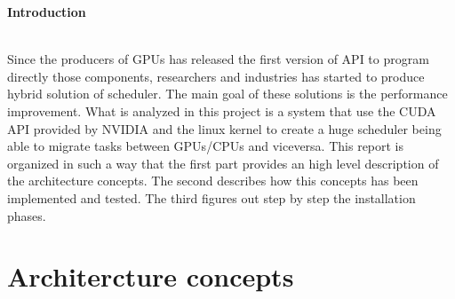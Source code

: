 \documentclass[a4paper,13pt]{article}
\newenvironment*{myabstract}{\begin{Large}\bf}{\end{Large}\\[2.5ex]}%
\begin{document}
\vspace{4ex}	%
\begin{multicols}{2}

\begin{myabstract} Introduction \end{myabstract}
Since the producers of GPUs has released the first version of API to program directly those 
components, researchers and industries has started to produce hybrid solution of scheduler. 
The main goal of these solutions is the performance improvement. What is analyzed in this project is 
a system that use the CUDA API provided by NVIDIA and the linux kernel to create a huge scheduler
being able to migrate tasks between GPUs/CPUs and viceversa. This report is organized in such a way
that the first part provides an high level description of the architecture concepts. The 
second describes how this concepts has been implemented and tested. The third figures out step by step
the installation phases. 




\section{Architercture concepts}


\end{multicols}
\end{document}
